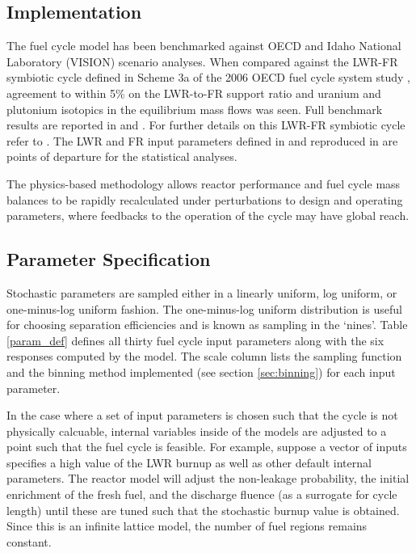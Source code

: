 \documentclass[preprint,12pt]{elsarticle}
\begin{document}
\subsection{Implementation}
\label{sec:implementation}

The fuel cycle model has been benchmarked against OECD and Idaho National Laboratory
(VISION) scenario analyses. When compared against the LWR-FR symbiotic cycle defined in Scheme
3a of the 2006 OECD fuel cycle system study \cite{NEA-5990}, agreement to within 5\% on the LWR-to-FR support
ratio and uranium and plutonium isotopics in the equilibrium mass flows was seen. Full benchmark
results are reported in \cite{Scopatz2009} and \cite{Li2009}.  For further details on this LWR-FR
symbiotic cycle refer to \cite{Shropshire2009}. The LWR and FR input parameters defined in
\cite{Shropshire2009} and reproduced in \cite{Scopatz2009} are points of departure for the
statistical analyses.

The physics-based methodology allows reactor performance and fuel cycle mass
balances to be rapidly recalculated under perturbations to design and operating parameters, where feedbacks to the operation of the cycle may have global reach.

\subsection{Parameter Specification}
\label{sec:paramspec}

Stochastic parameters are sampled either in a linearly uniform, log uniform, or one-minus-log uniform fashion.
The one-minus-log uniform distribution is useful for choosing separation efficiencies and is known as sampling
in the `nines'.  Table \ref{param_def} defines all thirty fuel cycle input parameters along with the six
responses computed by the model.  The scale column lists the sampling function
and the binning method implemented (see section \ref{sec:binning}) for each input parameter.

In the case where a set of input parameters is chosen such that the cycle is not physically calcuable,
internal variables inside of the models are adjusted to a point such that the fuel cycle is feasible.
For example, suppose a vector of inputs specifies a high value of the LWR burnup as well as other default
internal parameters.  The reactor model will adjust the non-leakage probability, the initial enrichment
of the fresh fuel, and the discharge fluence (as a surrogate for cycle length) until 
these are tuned such that the stochastic burnup value is obtained.  Since this 
is an infinite lattice model, the number of fuel regions remains constant.
\end{document}
